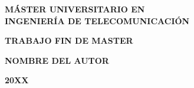 \pagestyle{empty}

\vspace*{5.5cm}

\begin{center}

{\Large\rm \textbf{ MÁSTER UNIVERSITARIO EN\\
INGENIERÍA DE TELECOMUNICACIÓN\\}}

\vspace{1.0cm}

{\Large\rm \textbf{TRABAJO FIN DE MASTER}}

\vspace{2cm}

{\Large\rm\textbf{\tfgtitle}}

\vspace*{\fill}

{\Large\rm\textbf{NOMBRE DEL AUTOR}}

{\Large \textbf{20XX}}
\vspace{1.0cm}
\end{center}


